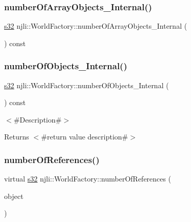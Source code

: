 \subsubsection{\texorpdfstring{number\+Of\+Array\+Objects\+\_\+\+Internal()}{numberOfArrayObjects\_Internal()}}
{\footnotesize\ttfamily \mbox{\hyperlink{_util_8h_aa62c75d314a0d1f37f79c4b73b2292e2}{s32}} njli\+::\+World\+Factory\+::number\+Of\+Array\+Objects\+\_\+\+Internal (\begin{DoxyParamCaption}{ }\end{DoxyParamCaption}) const\hspace{0.3cm}{\ttfamily [protected]}}

\mbox{\label{classnjli_1_1_world_factory_aa6f99c4fde05aa13eaf11c4cb1b8bc94}} 
\subsubsection{\texorpdfstring{number\+Of\+Objects\+\_\+\+Internal()}{numberOfObjects\_Internal()}}
{\footnotesize\ttfamily \mbox{\hyperlink{_util_8h_aa62c75d314a0d1f37f79c4b73b2292e2}{s32}} njli\+::\+World\+Factory\+::number\+Of\+Objects\+\_\+\+Internal (\begin{DoxyParamCaption}{ }\end{DoxyParamCaption}) const\hspace{0.3cm}{\ttfamily [protected]}}

$<$\#\+Description\#$>$

\begin{DoxyReturn}{Returns}
$<$\#return value description\#$>$ 
\end{DoxyReturn}
\mbox{\label{classnjli_1_1_world_factory_aad74e165dafe9781f2578dc3d29a1d07}} 
\subsubsection{\texorpdfstring{number\+Of\+References()}{numberOfReferences()}}
{\footnotesize\ttfamily virtual \mbox{\hyperlink{_util_8h_aa62c75d314a0d1f37f79c4b73b2292e2}{s32}} njli\+::\+World\+Factory\+::number\+Of\+References (\begin{DoxyParamCaption}\item[{\mbox{\hyperlink{classnjli_1_1_abstract_factory_object}{Abstract\+Factory\+Object}} $\ast$}]{object }\end{DoxyParamCaption})\hspace{0.3cm}{\ttfamily [virtual]}}



